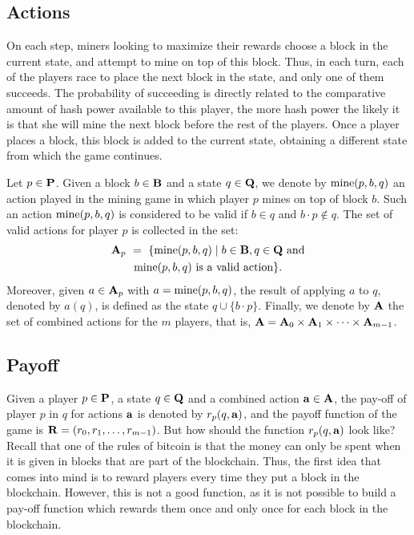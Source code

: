 \subsection{Actions}
On each step, miners looking to maximize their rewards choose a block in the current state, and attempt to mine on top of this block. Thus, in each turn, each of the players race to place the next block in the state, and only one of them succeeds. The probability of succeeding is directly related to the comparative amount of hash power available to this player, the more hash power the likely it is that she will mine the next block before the rest of the players. Once a player places a block, this block is added to the current state, obtaining a different state from which the game continues.

Let $p \in \mathbf{P}$. Given a block $b \in \mathbf{B}$ and a state $q \in \mathbf{Q}$, we denote by $\text{\rm mine}(p,b,q)$ an action played in the mining game in which player $p$ mines on top of block $b$. Such an action $\text{\rm mine}(p,b,q)$ is considered to be valid if $b \in q$ and $b\cdot p \not\in q$. The set of valid actions for player $p$ is collected in the set:
\begin{multline*}
\mathbf{A}_p \ = \ \{ \text{\rm mine}(p,b,q) \mid b \in \mathbf{B}, q \in \mathbf{Q} \text{ and}\\\text{\rm mine}(p,b,q) \text{ is a valid action}\}.
\end{multline*}
Moreover, given $a \in \mathbf{A}_p$ with $a = \text{\rm mine}(p,b,q)$, the result of applying $a$ to $q$, denoted by $a(q)$, is defined as the state $q \cup \{b \cdot p\}$. Finally, we denote by $\mathbf{A}$ the set of combined actions for the $m$ players, that is, $\mathbf{A} = \mathbf{A}_0 \times \mathbf{A}_1 \times \cdots \times \mathbf{A}_{m-1}$.

\subsection{Payoff}
Given a player $p \in \mathbf{P}$, a state $q \in \mathbf{Q}$ and a combined action $\mathbf{a} \in \mathbf{A}$, the pay-off of player $p$ in $q$ for actions $\mathbf{a}$ is denoted by $r_p(q,\mathbf{a})$, and the payoff function of the game is $\mathbf{R} = (r_0, r_1, \ldots, r_{m-1})$. %
But how should the function $r_p(q,\mathbf{a})$ look like? Recall that one of the rules of bitcoin is that the money can only 
be spent when it is given in blocks that are part of the blockchain. Thus, the first idea that comes into mind is to 
reward players every time they put a block in the blockchain. However, this is not a good function, as it is not possible to build a pay-off function which rewards them once and only once for each block in the blockchain.

